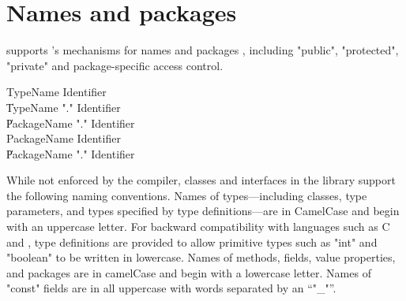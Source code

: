 \chapter{Names and packages}
\label{packages} 

\Xten{} supports \java's mechanisms for names and packages \cite[\S
6,\S 7]{jls2}, including \xcd"public", \xcd"protected", \xcd"private"
and package-specific access control.

\begin{grammar}
TypeName   \: Identifier \\
        \| TypeName \xcd"." Identifier \\
        \| PackageName \xcd"." Identifier \\
PackageName   \: Identifier \\
        \| PackageName \xcd"." Identifier \\
\end{grammar}


While not enforced by the compiler, classes and interfaces
in the \Xten{} library support the following naming conventions.
Names of types---including classes,
type
parameters, and types specified by type definitions---are in
CamelCase and begin with an uppercase letter.  For backward
compatibility with languages such as C and \java{}, type
definitions are provided to allow primitive types
such as \xcd"int" and \xcd"boolean" to be written in lowercase.
Names of methods, fields, value properties, and packages are in camelCase and begin with a lowercase letter.
Names of \xcd"const" fields are in all uppercase with words
separated by an ``\xcd"_"''.


